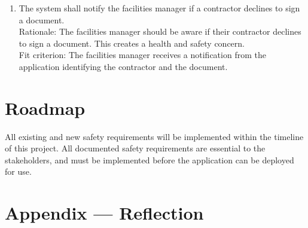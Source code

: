 \documentclass{article}
\begin{document}
\begin{enumerate}[{SFR}1.]
  \item The system shall notify the facilities manager if a contractor declines
    to sign a document.\\
    \newline Rationale: The facilities manager should be aware if
    their contractor
    declines to sign a document. This creates a health and safety concern.\\
    \newline Fit criterion: The facilities manager receives a
    notification from the
    application identifying the contractor and the document.
\end{enumerate}

\section{Roadmap}

All existing and new safety requirements will be implemented within
the timeline of this project. All documented safety requirements are
essential to the stakeholders, and must be implemented before the
application can be deployed for use.

\newpage{}

\section*{Appendix --- Reflection}


\end{document}
